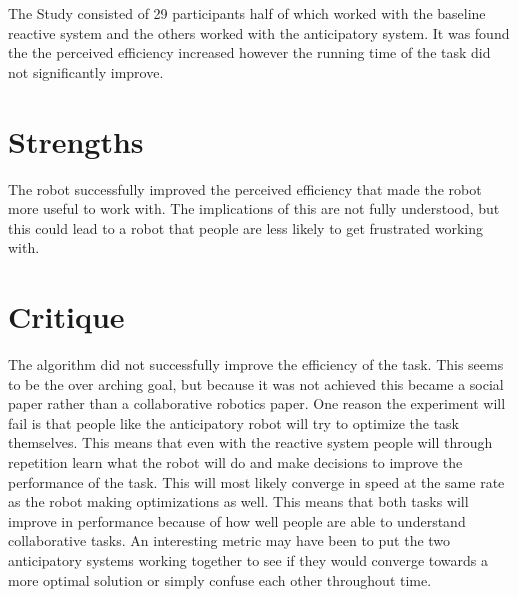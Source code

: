 \documentclass{article}
\begin{document}
The Study consisted of 29 participants half of which worked with the baseline reactive system and the others worked with the anticipatory system. It was found the the perceived efficiency increased however the running time of the task did not significantly improve.
\section*{Strengths}
The robot successfully improved the perceived efficiency that made the robot more useful to work with. The implications of this are not fully understood, but this could lead to a robot that people are less likely to get frustrated working with.
\section*{Critique}
The algorithm did not successfully improve the efficiency of the task. This seems to be the over arching goal, but because it was not achieved this became a social paper rather than a collaborative robotics paper. One reason the experiment will fail is that people like the anticipatory robot will try to optimize the task themselves. This means that even with the reactive system people will through repetition learn what the robot will do and make decisions to improve the performance of the task. This will most likely converge in speed at the same rate as the robot making optimizations as well. This means that both tasks will improve in performance because of how well people are able to understand collaborative tasks. An interesting metric may have been to put the two anticipatory systems working together to see if they would converge towards a more optimal solution or simply confuse each other throughout time.
\cite{goossens93}
\end{document}
